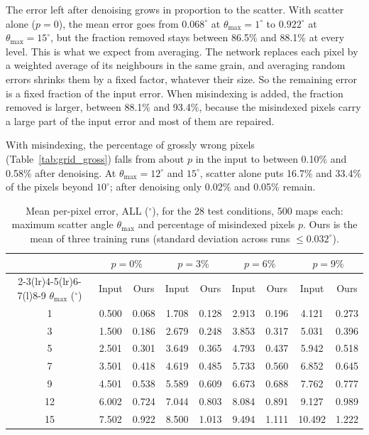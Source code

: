 The error left after denoising grows in proportion to the scatter. With scatter
alone ($p = 0$), the mean error goes from $0.068^\circ$ at
$\theta_{\max} = 1^\circ$ to $0.922^\circ$ at $\theta_{\max} = 15^\circ$, but
the fraction removed stays between 86.5\% and 88.1\% at every level. This is
what we expect from averaging. The network replaces each pixel by a weighted
average of its neighbours in the same grain, and averaging random errors
shrinks them by a fixed factor, whatever their size. So the remaining error is
a fixed fraction of the input error. When misindexing is added, the fraction
removed is larger, between 88.1\% and 93.4\%, because the misindexed pixels
carry a large part of the input error and most of them are repaired.

With misindexing, the percentage of grossly wrong pixels
(Table~\ref{tab:grid_gross}) falls from about $p$ in the input to between
0.10\% and 0.58\% after denoising. At
$\theta_{\max} = 12^\circ$ and $15^\circ$, scatter alone puts 16.7\% and 33.4\%
of the pixels beyond $10^\circ$; after denoising only 0.02\% and 0.05\% remain.

\begin{table}[t]
  \centering
  \caption{Mean per-pixel error, ALL ($^\circ$), for the 28 test conditions,
    500 maps each: maximum scatter angle $\theta_{\max}$ and percentage of
    misindexed pixels $p$. Ours is the mean of three training runs (standard
    deviation across runs $\leq 0.032^\circ$).}
  \label{tab:grid_all}
  \begin{tabular}{@{}c cc cc cc cc@{}}
    \toprule
    & \multicolumn{2}{c}{$p = 0\%$} & \multicolumn{2}{c}{$p = 3\%$}
    & \multicolumn{2}{c}{$p = 6\%$} & \multicolumn{2}{c}{$p = 9\%$} \\
    \cmidrule(lr){2-3}\cmidrule(lr){4-5}\cmidrule(lr){6-7}\cmidrule(l){8-9}
    $\theta_{\max}$ ($^\circ$) & Input & Ours & Input & Ours & Input & Ours & Input & Ours \\
    \midrule
     1 & 0.500 & 0.068 & 1.708 & 0.128 & 2.913 & 0.196 & 4.121 & 0.273 \\
     3 & 1.500 & 0.186 & 2.679 & 0.248 & 3.853 & 0.317 & 5.031 & 0.396 \\
     5 & 2.501 & 0.301 & 3.649 & 0.365 & 4.793 & 0.437 & 5.942 & 0.518 \\
     7 & 3.501 & 0.418 & 4.619 & 0.485 & 5.733 & 0.560 & 6.852 & 0.645 \\
     9 & 4.501 & 0.538 & 5.589 & 0.609 & 6.673 & 0.688 & 7.762 & 0.777 \\
    12 & 6.002 & 0.724 & 7.044 & 0.803 & 8.084 & 0.891 & 9.127 & 0.989 \\
    15 & 7.502 & 0.922 & 8.500 & 1.013 & 9.494 & 1.111 & 10.492 & 1.222 \\
    \bottomrule
  \end{tabular}
\end{table}

